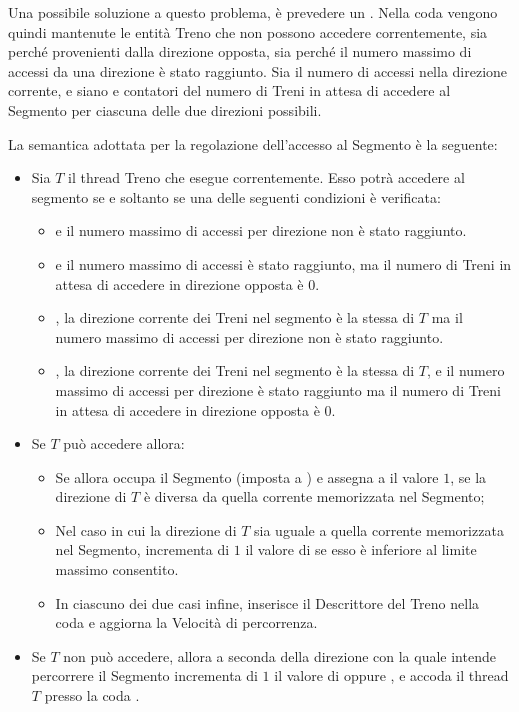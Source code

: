 \begin{description}
			Una possibile soluzione a questo problema, è prevedere un . Nella coda  vengono quindi mantenute  le entità Treno che non possono accedere correntemente, sia perché provenienti dalla direzione opposta, sia perché il numero massimo di accessi da una direzione è stato raggiunto. 
		Sia  il numero di accessi nella direzione corrente, e siano  e  contatori del numero di Treni in attesa di accedere al Segmento per ciascuna delle due direzioni possibili.
		
		La semantica adottata per la regolazione dell'accesso al Segmento è la seguente:
		\begin{itemize}
			\item Sia $T$ il thread Treno che esegue correntemente. Esso potrà accedere al segmento se e soltanto se una delle seguenti condizioni è verificata:
				\begin{itemize}
					\item {} e il numero massimo di accessi per direzione non è stato raggiunto.
					\item {} e il numero massimo di accessi è stato raggiunto, ma il numero di Treni in attesa di accedere in direzione opposta è 0.
					\item {}, la direzione corrente dei Treni nel segmento è la stessa di $T$ ma il numero massimo di accessi per direzione non è stato raggiunto.
					\item {}, la direzione corrente dei Treni nel segmento è la stessa di $T$, e il numero massimo di accessi per direzione è stato raggiunto ma il numero di Treni in attesa di accedere in direzione opposta è 0.
				\end{itemize}
			\item Se $T$ può accedere allora:
				\begin{itemize}
					\item Se  allora occupa il Segmento (imposta  a ) e assegna a  il valore $1$, se la direzione di $T$ è diversa da quella corrente memorizzata nel Segmento;
					\item Nel caso in cui la direzione di $T$ sia uguale a quella corrente memorizzata nel Segmento, incrementa di $1$ il valore di  se esso è inferiore al limite massimo consentito.
					\item In ciascuno dei due casi infine, inserisce il Descrittore del Treno nella coda  e aggiorna la Velocità di percorrenza.
				\end{itemize}
			\item Se $T$ non può accedere, allora a seconda della direzione con la quale intende percorrere il Segmento incrementa di $1$ il valore di  oppure , e accoda il thread $T$ presso la coda .
		\end{itemize}
			

\end{description}
